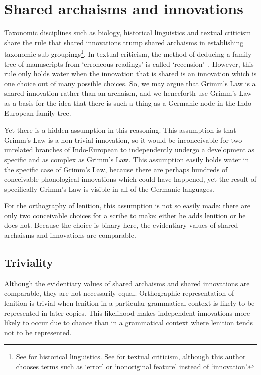 \section{Shared archaisms and innovations}
\label{sec:shar-innov-arch}

Taxonomic disciplines such as biology, historical linguistics and textual criticism  share the rule that shared innovations trump shared archaisms in establishing taxonomic sub-groupings\footnote{See \eg \textcite[169]{MT_Trask15} for historical linguistics. See \eg \textcite[103--104, 107]{Tar_Classical95} for textual criticism, although this author chooses terms such as `error' or `nonoriginal feature' instead of `innovation'.}. In textual criticism, the method of deducing a family tree of manuscripts from `erroneous readings' is called `recension'~\autocite[232]{Sar_Manuscript13}. However, this rule only holds water when the innovation that is shared is an innovation which is one choice out of many possible choices. So,  we may argue that \eg Grimm's Law is a shared innovation rather than an archaism, and we henceforth use Grimm's Law as a basis for the idea that there is such a thing as a Germanic node in the Indo-European family tree.

Yet there is a hidden assumption  in this reasoning. This assumption is that Grimm's Law is a non-trivial innovation, so it would be inconceivable for two unrelated branches of Indo-European to independently undergo a development as specific and as complex as Grimm's Law.  This assumption easily holds water in the specific case of Grimm's Law, because there are perhaps hundreds of conceivable phonological innovations which could have happened, yet the result of specifically Grimm's Law is visible in all of the Germanic languages.

For the orthography of lenition, this assumption is not so easily made: there are only two conceivable choices for a scribe to make: either he adds lenition or he does not. Because the choice is binary here, the evidentiary values of shared archaisms and innovations are comparable.

\subsection{Triviality}
\label{sec:more-fund-disc}
Although the evidentiary values of shared archaisms and shared innovations are comparable, they are not necessarily equal. Orthographic representation of lenition is trivial when lenition in a particular grammatical context is likely to be represented in later copies. This likelihood makes independent innovations more likely to occur due to chance than in a grammatical context where lenition tends not to be represented.

